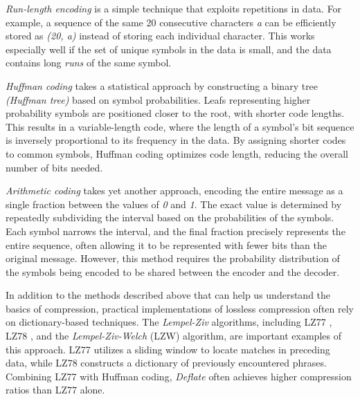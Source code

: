 \emph{Run-length encoding} is a simple technique that exploits repetitions in data. For example, a sequence of the same 20 consecutive characters \emph{a} can be efficiently stored as \emph{(20, a)} instead of storing each individual character. This works especially well if the set of unique symbols in the data is small, and the data contains long \emph{runs} of the same symbol.

\emph{Huffman coding} \cite{huffman1952method} takes a statistical approach by constructing a binary tree \emph{(Huffman tree)} based on symbol probabilities. Leafs representing higher probability symbols are positioned closer to the root, with shorter code lengths. This results in a variable-length code, where the length of a symbol's bit sequence is inversely proportional to its frequency in the data. By assigning shorter codes to common symbols, Huffman coding optimizes code length, reducing the overall number of bits needed.


\emph{Arithmetic coding} \cite{rissanen1978modeling,pasco1976source} takes yet another approach, encoding the entire message as a single fraction between the values of \emph{0} and \emph{1}. The exact value is determined by repeatedly subdividing the interval based on the probabilities of the symbols. Each symbol narrows the interval, and the final fraction precisely represents the entire sequence, often allowing it to be represented with fewer bits than the original message. However, this method requires the probability distribution of the symbols being encoded to be shared between the encoder and the decoder.



In addition to the methods described above that can help us understand the basics of compression, practical implementations of lossless compression often rely on dictionary-based techniques. The \emph{Lempel-Ziv} algorithms, including LZ77 \cite{ziv1977universal-compression}, LZ78 \cite{ziv1978compression}, and the \emph{Lempel-Ziv-Welch} (LZW) \cite{welch1984technique-compression} algorithm, are important examples of this approach. LZ77 utilizes a sliding window to locate matches in preceding data, while LZ78 constructs a dictionary of previously encountered phrases. Combining LZ77 with Huffman coding, \emph{Deflate} \cite{deflate1996} often achieves higher compression ratios than LZ77 alone.

